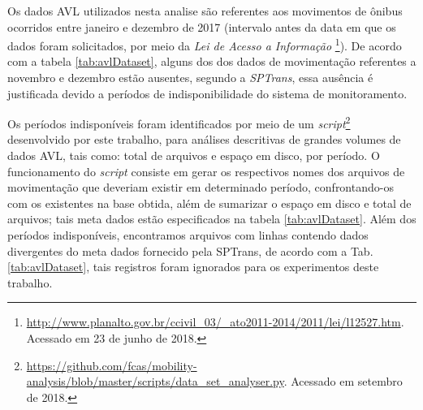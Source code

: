 \documentclass[
	12pt,				%
	oneside,			%
	a4paper,			%
	english,			%
	brazil				%
	]{abntex2ppgsi}
\begin{document}
Os dados AVL utilizados nesta analise são referentes aos movimentos de ônibus ocorridos entre janeiro e dezembro de 2017 (intervalo antes da data em que os dados foram solicitados, por meio da \textit{Lei de Acesso a Informação} \footnote{\url{http://www.planalto.gov.br/ccivil\_03/\_ato2011-2014/2011/lei/l12527.htm}. Acessado em 23 de junho de 2018.}). De acordo com a tabela \ref{tab:avlDataset}, alguns dos dos dados de movimentação referentes a novembro e dezembro estão ausentes, segundo a \textit{SPTrans}, essa ausência é justificada devido a períodos de indisponibilidade do sistema de monitoramento.

Os períodos indisponíveis foram identificados por meio de um \textit{script}\footnote{\url{https://github.com/fcas/mobility-analysis/blob/master/scripts/data_set_analyser.py}. Acessado em setembro de 2018.} desenvolvido por este trabalho, para análises descritivas de grandes volumes de dados AVL, tais como: total de arquivos e espaço em disco, por período. O funcionamento do \textit{script} consiste em gerar os respectivos nomes dos arquivos de movimentação que deveriam existir em determinado período, confrontando-os com os existentes na base obtida, além de sumarizar o espaço em disco e total de arquivos; tais meta dados estão especificados na tabela \ref{tab:avlDataset}. Além dos períodos indisponíveis, encontramos arquivos com linhas contendo dados divergentes do meta dados fornecido pela SPTrans,  de acordo com a Tab. \ref{tab:avlDataset}, tais registros foram ignorados para os experimentos deste trabalho.
\end{document}

